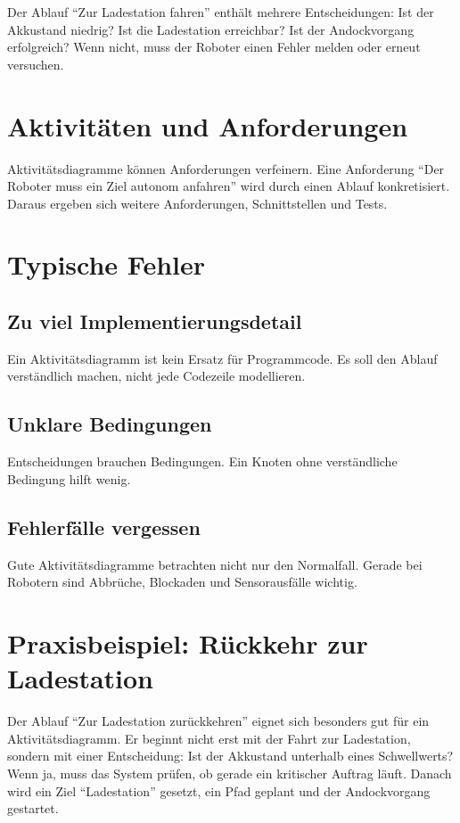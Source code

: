 \begin{praxisbox}
Der Ablauf \enquote{Zur Ladestation fahren} enthält mehrere Entscheidungen: Ist der Akkustand niedrig? Ist die Ladestation erreichbar? Ist der Andockvorgang erfolgreich? Wenn nicht, muss der Roboter einen Fehler melden oder erneut versuchen.
\end{praxisbox}

\section{Aktivitäten und Anforderungen}
Aktivitätsdiagramme können Anforderungen verfeinern. Eine Anforderung \enquote{Der Roboter muss ein Ziel autonom anfahren} wird durch einen Ablauf konkretisiert. Daraus ergeben sich weitere Anforderungen, Schnittstellen und Tests.

\section{Typische Fehler}
\subsection{Zu viel Implementierungsdetail}
Ein Aktivitätsdiagramm ist kein Ersatz für Programmcode. Es soll den Ablauf verständlich machen, nicht jede Codezeile modellieren.

\subsection{Unklare Bedingungen}
Entscheidungen brauchen Bedingungen. Ein Knoten ohne verständliche Bedingung hilft wenig.

\subsection{Fehlerfälle vergessen}
Gute Aktivitätsdiagramme betrachten nicht nur den Normalfall. Gerade bei Robotern sind Abbrüche, Blockaden und Sensorausfälle wichtig.

\section{Praxisbeispiel: Rückkehr zur Ladestation}
Der Ablauf \enquote{Zur Ladestation zurückkehren} eignet sich besonders gut für ein Aktivitätsdiagramm. Er beginnt nicht erst mit der Fahrt zur Ladestation, sondern mit einer Entscheidung: Ist der Akkustand unterhalb eines Schwellwerts? Wenn ja, muss das System prüfen, ob gerade ein kritischer Auftrag läuft. Danach wird ein Ziel \enquote{Ladestation} gesetzt, ein Pfad geplant und der Andockvorgang gestartet.

